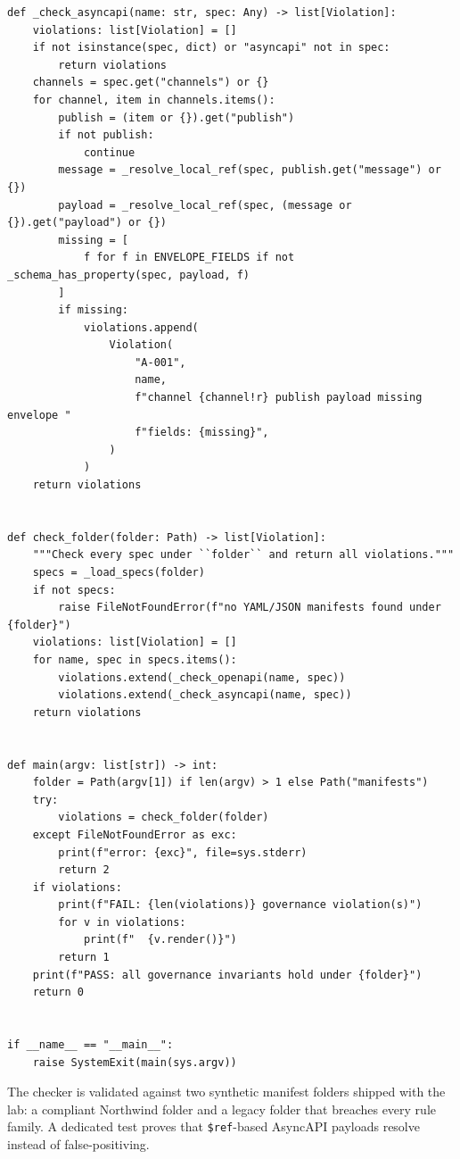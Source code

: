\begin{verbatim}
def _check_asyncapi(name: str, spec: Any) -> list[Violation]:
    violations: list[Violation] = []
    if not isinstance(spec, dict) or "asyncapi" not in spec:
        return violations
    channels = spec.get("channels") or {}
    for channel, item in channels.items():
        publish = (item or {}).get("publish")
        if not publish:
            continue
        message = _resolve_local_ref(spec, publish.get("message") or {})
        payload = _resolve_local_ref(spec, (message or {}).get("payload") or {})
        missing = [
            f for f in ENVELOPE_FIELDS if not _schema_has_property(spec, payload, f)
        ]
        if missing:
            violations.append(
                Violation(
                    "A-001",
                    name,
                    f"channel {channel!r} publish payload missing envelope "
                    f"fields: {missing}",
                )
            )
    return violations


def check_folder(folder: Path) -> list[Violation]:
    """Check every spec under ``folder`` and return all violations."""
    specs = _load_specs(folder)
    if not specs:
        raise FileNotFoundError(f"no YAML/JSON manifests found under {folder}")
    violations: list[Violation] = []
    for name, spec in specs.items():
        violations.extend(_check_openapi(name, spec))
        violations.extend(_check_asyncapi(name, spec))
    return violations


def main(argv: list[str]) -> int:
    folder = Path(argv[1]) if len(argv) > 1 else Path("manifests")
    try:
        violations = check_folder(folder)
    except FileNotFoundError as exc:
        print(f"error: {exc}", file=sys.stderr)
        return 2
    if violations:
        print(f"FAIL: {len(violations)} governance violation(s)")
        for v in violations:
            print(f"  {v.render()}")
        return 1
    print(f"PASS: all governance invariants hold under {folder}")
    return 0


if __name__ == "__main__":
    raise SystemExit(main(sys.argv))
\end{verbatim}

The checker is validated against two synthetic manifest folders shipped with
the lab: a compliant Northwind folder and a legacy folder that breaches every
rule family. A dedicated test proves that \texttt{\$ref}-based AsyncAPI
payloads resolve instead of false-positiving.

